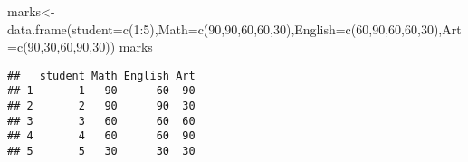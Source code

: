 \documentclass[
]{article}
\newenvironment{Shaded}{\begin{snugshade}}{\end{snugshade}}
\newcommand{\DecValTok}[1]{\textcolor[rgb]{0.00,0.00,0.81}{#1}}
\newcommand{\FunctionTok}[1]{\textcolor[rgb]{0.00,0.00,0.00}{#1}}
\newcommand{\NormalTok}[1]{#1}
\newcommand{\OtherTok}[1]{\textcolor[rgb]{0.56,0.35,0.01}{#1}}
\newcommand{\SpecialCharTok}[1]{\textcolor[rgb]{0.00,0.00,0.00}{#1}}
\newcommand{\StringTok}[1]{\textcolor[rgb]{0.31,0.60,0.02}{#1}}
\begin{document}
\begin{Shaded}
\begin{Highlighting}[]
\NormalTok{marks}\OtherTok{\textless{}{-}}\FunctionTok{data.frame}\NormalTok{(}\StringTok{\textquotesingle{}student\textquotesingle{}}\OtherTok{=}\FunctionTok{c}\NormalTok{(}\DecValTok{1}\SpecialCharTok{:}\DecValTok{5}\NormalTok{),}\StringTok{\textquotesingle{}Math\textquotesingle{}}\OtherTok{=}\FunctionTok{c}\NormalTok{(}\DecValTok{90}\NormalTok{,}\DecValTok{90}\NormalTok{,}\DecValTok{60}\NormalTok{,}\DecValTok{60}\NormalTok{,}\DecValTok{30}\NormalTok{),}\StringTok{\textquotesingle{}English\textquotesingle{}}\OtherTok{=}\FunctionTok{c}\NormalTok{(}\DecValTok{60}\NormalTok{,}\DecValTok{90}\NormalTok{,}\DecValTok{60}\NormalTok{,}\DecValTok{60}\NormalTok{,}\DecValTok{30}\NormalTok{),}\StringTok{\textquotesingle{}Art\textquotesingle{}}\OtherTok{=}\FunctionTok{c}\NormalTok{(}\DecValTok{90}\NormalTok{,}\DecValTok{30}\NormalTok{,}\DecValTok{60}\NormalTok{,}\DecValTok{90}\NormalTok{,}\DecValTok{30}\NormalTok{))}
\NormalTok{marks}
\end{Highlighting}
\end{Shaded}

\begin{verbatim}
##   student Math English Art
## 1       1   90      60  90
## 2       2   90      90  30
## 3       3   60      60  60
## 4       4   60      60  90
## 5       5   30      30  30
\end{verbatim}
\end{document}
